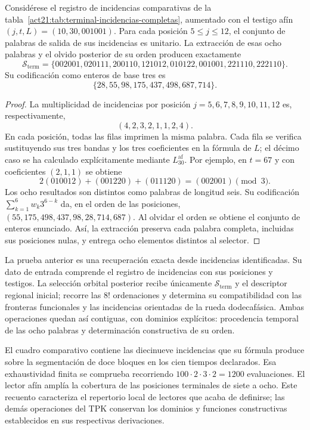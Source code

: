 \begin{proposition}
\label{act21:prop:repertorio-terminal-ocho-incidencias}
Considérese el registro de incidencias comparativas de la
tabla~\ref{act21:tab:terminal-incidencias-completas}, aumentado con el testigo
afín $(j,t,L)=(10,30,001001)$. Para cada posición $5\leq j\leq12$, el
conjunto de palabras de salida de sus incidencias es unitario. La
extracción de esas ocho palabras y el olvido posterior de su orden
producen exactamente
\[
 \mathcal S_{\mathrm{term}}=
 \{002001,020111,200110,121012,010122,001001,221110,222110\}.
\]
Su codificación como enteros de base tres es
\[
 \{28,55,98,175,437,498,687,714\}.
\]
\end{proposition}
\begin{proof}
La multiplicidad de incidencias por posición $j=5,6,7,8,9,10,11,12$
es, respectivamente,
\[
 (4,2,3,2,1,1,2,4).
\]
En cada posición, todas las filas imprimen la misma palabra. Cada fila
se verifica sustituyendo sus tres bandas y los tres coeficientes en la
fórmula de $L$; el décimo caso se ha calculado explícitamente mediante
$L^{\mathrm{af}}_{30}$. Por ejemplo, en $t=67$ y con coeficientes
$(2,1,1)$ se obtiene
\[
 2(010012)+(001220)+(011120)=(002001)\pmod3.
\]
Los ocho resultados son distintos como palabras de longitud seis. Su
codificación $\sum_{k=1}^{6}w_k3^{6-k}$ da, en el orden de las
posiciones, $(55,175,498,437,98,28,714,687)$. Al olvidar el orden se
obtiene el conjunto de enteros enunciado. Así, la extracción preserva
cada palabra completa, incluidas sus posiciones nulas, y entrega ocho
elementos distintos al selector.
\end{proof}

La prueba anterior es una recuperación exacta desde incidencias
identificadas. Su dato de entrada comprende el registro de incidencias
con sus posiciones y testigos. La selección orbital posterior recibe
únicamente $\mathcal S_{\mathrm{term}}$ y el descriptor regional inicial;
recorre las $8!$ ordenaciones y determina su compatibilidad con las
fronteras funcionales y las incidencias orientadas de la rueda
dodecafásica. Ambas operaciones quedan así contiguas, con dominios
explícitos: procedencia temporal de las ocho palabras y determinación
constructiva de su orden.

El cuadro comparativo contiene las diecinueve incidencias que su fórmula
produce sobre la segmentación de doce bloques en los cien tiempos
declarados. Esa exhaustividad finita se comprueba recorriendo
$100\cdot2\cdot3\cdot2=1200$ evaluaciones. El lector afín amplía la
cobertura de las posiciones terminales de siete a ocho. Este recuento
caracteriza el repertorio local de lectores que acaba de definirse;
las demás operaciones del TPK conservan los dominios y funciones
constructivas establecidos en sus respectivas derivaciones.

